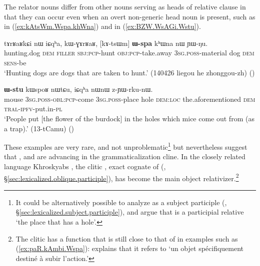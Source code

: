 The relator nouns differ from other nouns serving as heads of relative clause in that they can occur even when an overt non-generic head noun is present, such as  in (\ref{ex:kAtsWm.Wspa.khWna}) and  in (\ref{ex:BZW.WsAGi.Wstu}). 

 \begin{exe}
\ex \label{ex:kAtsWm.Wspa.khWna} 
\gll  tɤrʁaʁkɕi nɯ iɕqʰa, kɯ-ɣɤrʁaʁ, [kɤ-tsɯm] \textbf{ɯ-spa} kʰɯna nɯ ɲɯ-ŋu. \\
hunting.dog \textsc{dem} \textsc{filler} \textsc{sbj}:\textsc{pcp}-hunt \textsc{obj}:\textsc{pcp}-take.away \textsc{3sg}.\textsc{poss}-material dog \textsc{dem} \textsc{sens}-be \\
\glt `Hunting dogs are dogs that are taken to hunt.' (140426 liegou he zhonggou-zh)
()
\end{exe}  

 \begin{exe}
\ex \label{ex:BZW.WsAGi.Wstu} 
\gll  [βʑɯ ɯ-sɤ-ɣi] \textbf{ɯ-stu} kɯspoʁ nɯtɕu, iɕqʰa nɯnɯ z-ɲɯ-rku-nɯ. \\
mouse \textsc{3sg}.\textsc{poss}-\textsc{obl}:\textsc{pcp}-come \textsc{3sg}.\textsc{poss}-place hole \textsc{dem}:\textsc{loc} the.aforementioned \textsc{dem} \textsc{tral}-\textsc{ipfv}-put.in-\textsc{pl} \\
\glt `People put [the flower of the burdock] in the holes  which mice come out from (as a trap).' (13-tCamu)
()
\end{exe}  
  
These examples are very rare, and not unproblematic\footnote{It could be alternatively possible to analyze  as a subject participle   (, §\ref{sec:lexicalized.subject.participle}), and argue that  is a participial relative `the place that has a hole'. }  but nevertheless suggest that ,  and  are advancing in the grammaticalization cline.   In the closely related language Khroskyabs \citep[580]{lai17khroskyabs}, the clitic , exact cognate of   (, §\ref{sec:lexicalized.oblique.participle}), has become the main object relativizer.\footnote{The clitic  has a function that is still close to that of  in examples such as (\ref{ex:paR.kAmbi.Wspa}):   \citet[514]{lai17khroskyabs} explains that it refers to `un objet spécifiquement destiné à subir l’action.'  }
 

